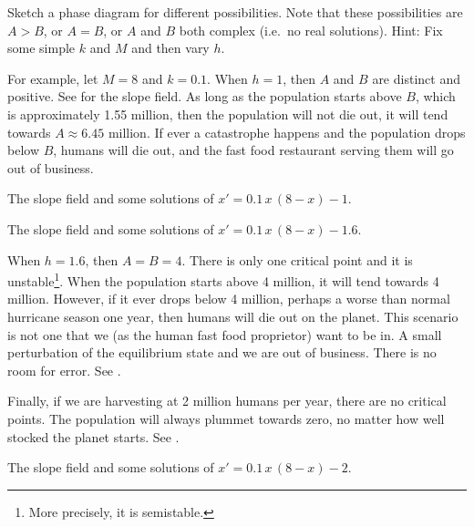 \begin{exercise}
Sketch a phase diagram for different possibilities.  Note
that these possibilities are $A > B$, or $A=B$, or $A$ and $B$ both complex
(i.e.\ no real solutions).  Hint: Fix some simple $k$ and $M$ and then vary
$h$.
\end{exercise}

For example, let $M=8$ and $k=0.1$.
When $h=1$, then $A$ and $B$ are distinct and positive.
See  for the slope field.  As long as 
the population starts above $B$, which is approximately 1.55 million, then
the population will not die out, it will tend towards $A \approx
6.45$ million.  If ever a catastrophe happens and
the population drops below $B$,
humans will die out, and the fast food restaurant serving them will go out
of business.

\begin{myfig}
\parbox[t]{3.0in}{
 \capstart
 \caption{The slope field and some solutions of
 $x' = 0.1\,x\,(8-x)-1$.\label{2.2:harv1}}
}
\quad
\parbox[t]{3.0in}{
 \capstart
 \caption{The slope field and some solutions of
 $x' = 0.1\,x\,(8-x)-1.6$.\label{2.2:harvc}}
}
\end{myfig}

When $h = 1.6$, then $A=B=4$.  There is only one critical point and it is
unstable\footnote{More precisely, it is semistable.}.
When the population starts above 4 million, it will tend towards
4 million.  However, if it ever drops below 4 million, perhaps a worse than
normal hurricane season one year, then humans will die out on the
planet.  This scenario is not one that we (as the human fast food proprietor) 
want to be in.  A small perturbation of the equilibrium state and we are out
of business.  There is no room for error.  See .

Finally, if we are harvesting at 2 million humans per year, there are no
critical points.
The population
will always plummet towards zero, no matter how well stocked the planet
starts.  See .

\begin{myfig}
\capstart
{}
\caption{The slope field and some solutions of
$x' = 0.1\,x\,(8-x)-2$.\label{2.2:harv2}}
\end{myfig}


